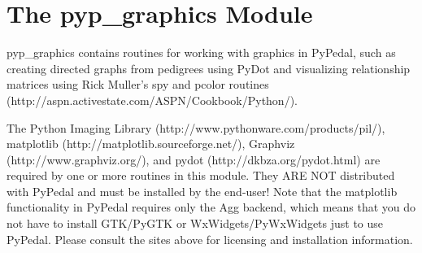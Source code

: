 \documentclass{article}
\begin{document}
\section*{The pyp\_graphics Module}
\par pyp\_graphics contains routines for working with graphics in PyPedal, such as
creating directed graphs from pedigrees using PyDot and visualizing relationship
matrices using Rick Muller's spy and pcolor routines
(http://aspn.activestate.com/ASPN/Cookbook/Python/).

The Python Imaging Library (http://www.pythonware.com/products/pil/),
matplotlib (http://matplotlib.sourceforge.net/), Graphviz (http://www.graphviz.org/),
and pydot (http://dkbza.org/pydot.html) are required by one or more routines in this
module.  They ARE NOT distributed with PyPedal and must be installed by the end-user!
Note that the matplotlib functionality in PyPedal requires only the Agg backend, which
means that you do not have to install GTK/PyGTK or WxWidgets/PyWxWidgets just to use
PyPedal.  Please consult the sites above for licensing and installation information.
\end{document}
